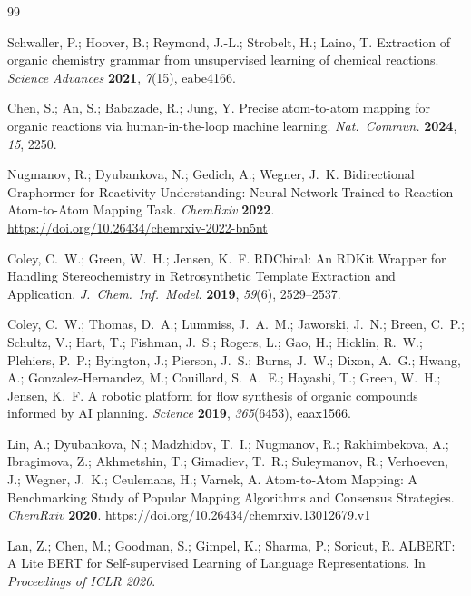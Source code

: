 \documentclass[12pt]{article}
\begin{document}
\begin{thebibliography}{99}

  Schwaller, P.; Hoover, B.; Reymond, J.-L.; Strobelt, H.; Laino, T.
  Extraction of organic chemistry grammar from unsupervised learning of
  chemical reactions.
  \emph{Science Advances} \textbf{2021}, \emph{7}(15), eabe4166.

  Chen, S.; An, S.; Babazade, R.; Jung, Y.
  Precise atom-to-atom mapping for organic reactions via human-in-the-loop
  machine learning.
  \emph{Nat.\ Commun.} \textbf{2024}, \emph{15}, 2250.

  Nugmanov, R.; Dyubankova, N.; Gedich, A.; Wegner, J.~K.
  Bidirectional Graphormer for Reactivity Understanding: Neural Network
  Trained to Reaction Atom-to-Atom Mapping Task.
  \emph{ChemRxiv} \textbf{2022}. \url{https://doi.org/10.26434/chemrxiv-2022-bn5nt}


  Coley, C.~W.; Green, W.~H.; Jensen, K.~F.
  RDChiral: An RDKit Wrapper for Handling Stereochemistry in
  Retrosynthetic Template Extraction and Application.
  \emph{J.\ Chem.\ Inf.\ Model.} \textbf{2019}, \emph{59}(6), 2529--2537.

  Coley, C.~W.; Thomas, D.~A.; Lummiss, J.~A.~M.; Jaworski, J.~N.;
  Breen, C.~P.; Schultz, V.; Hart, T.; Fishman, J.~S.; Rogers, L.;
  Gao, H.; Hicklin, R.~W.; Plehiers, P.~P.; Byington, J.; Pierson, J.~S.;
  Burns, J.~W.; Dixon, A.~G.; Hwang, A.; Gonzalez-Hernandez, M.;
  Couillard, S.~A.~E.; Hayashi, T.; Green, W.~H.; Jensen, K.~F.
  A robotic platform for flow synthesis of organic compounds informed by
  AI planning.
  \emph{Science} \textbf{2019}, \emph{365}(6453), eaax1566.

  Lin, A.; Dyubankova, N.; Madzhidov, T.~I.; Nugmanov, R.; Rakhimbekova, A.;
  Ibragimova, Z.; Akhmetshin, T.; Gimadiev, T.~R.; Suleymanov, R.;
  Verhoeven, J.; Wegner, J.~K.; Ceulemans, H.; Varnek, A.
  Atom-to-Atom Mapping: A Benchmarking Study of Popular Mapping Algorithms
  and Consensus Strategies.
  \emph{ChemRxiv} \textbf{2020}. \url{https://doi.org/10.26434/chemrxiv.13012679.v1}

  Lan, Z.; Chen, M.; Goodman, S.; Gimpel, K.; Sharma, P.; Soricut, R.
  ALBERT: A Lite BERT for Self-supervised Learning of Language
  Representations.
  In \emph{Proceedings of ICLR 2020}.


\end{thebibliography}
\end{document}
